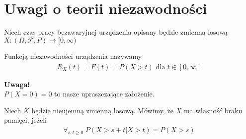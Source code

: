 \section{Uwagi o teorii niezawodności}
Niech czas pracy bezawaryjnej urządzenia opisany będzie zmienną losową $ X:(\Omega,\mathcal F ,P)\to[0,\infty ) $
\begin{defi}Funkcją niezawodności urządzenia nazywamy
\begin{gather*}
R_X(t)=\overline{F}(t)=P\left(X>t\right)\text{ dla }t\in[0,\infty ]
\end{gather*}
\end{defi}

\textbf{Uwaga!}\\
$ P\left(X=0\right) =0$ to nasze upraszczające założenie.
\begin{defi}
Niech $ X $ będzie nieujemną zmienną losową. Mówimy, że $ X $  ma własność braku pamięci, jeżeli
\begin{gather*}
\forall_{s,t\ge0}\;P\left(X>s+t|X>t\right)=P\left(X>s\right)
\end{gather*}
\end{defi}
